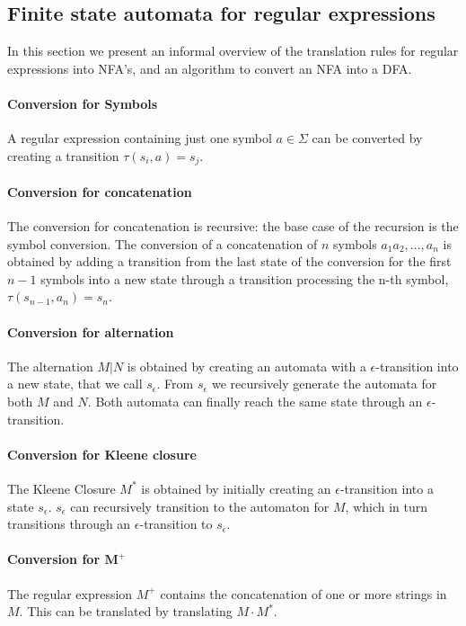 \subsection{Finite state automata for regular expressions}
\label{subsec:ch_background_automata}
In this section we present an informal overview of the translation rules for regular expressions into NFA's, and an algorithm to convert an NFA into a DFA.

\paragraph{Conversion for Symbols}
A regular expression containing just one symbol $a \in \Sigma$ can be converted by creating a transition $\tau(s_{i},a) = s_{j}$.

\paragraph{Conversion for concatenation}
The conversion for concatenation is recursive: the base case of the recursion is the symbol conversion. The conversion of a concatenation of $n$ symbols $a_{1}a_{2}, ..., a_{n}$ is obtained by adding a transition from the last state of the conversion for the first $n - 1$ symbols into a new state through a transition processing the n-th symbol, $\tau(s_{n - 1},a_{n}) = s_{n}$.

\paragraph{Conversion for alternation}
The alternation $M | N$ is obtained by creating an automata with a $\epsilon$-transition into a new state, that we call $s_{\epsilon}$. From $s_{\epsilon}$ we recursively generate the automata for both $M$ and $N$. Both automata can finally reach the same state through an $\epsilon$-transition.

\paragraph{Conversion for Kleene closure}
The Kleene Closure $M^{*}$ is obtained by initially creating an $\epsilon$-transition into a state $s_{\epsilon}$. $s_{\epsilon}$ can recursively transition to the automaton for $M$, which in turn transitions through an $\epsilon$-transition to $s_{\epsilon}$.

\paragraph{Conversion for $\mathbf{M^{+}}$}
The regular expression $M^{+}$ contains the concatenation of one or more strings in $M$. This can be translated by translating $M \cdot M^{*}$.

